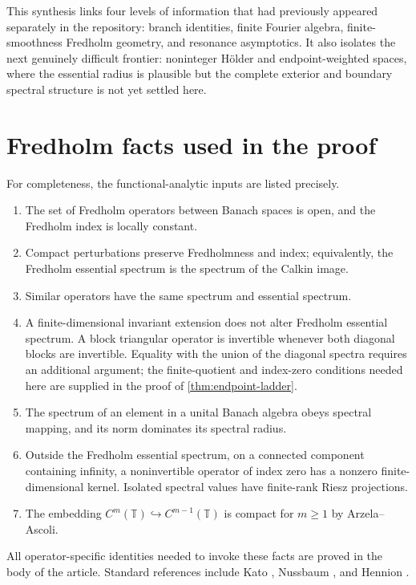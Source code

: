 \documentclass[11pt,a4paper]{article}
\theoremstyle{definition}
\theoremstyle{remark}
\newcommand{\T}{\mathbb T}
\begin{document}
This synthesis links four levels of information that had previously appeared
separately in the repository: branch identities, finite Fourier algebra,
finite-smoothness Fredholm geometry, and resonance asymptotics.  It also
isolates the next genuinely difficult frontier: noninteger H\"older and
endpoint-weighted spaces, where the essential radius is plausible but the
complete exterior and boundary spectral structure is not yet settled here.

\appendix
\section{Fredholm facts used in the proof}
\label{app:fredholm}
For completeness, the functional-analytic inputs are listed precisely.

\begin{enumerate}
\item The set of Fredholm operators between Banach spaces is open, and the
      Fredholm index is locally constant.
\item Compact perturbations preserve Fredholmness and index; equivalently,
      the Fredholm essential spectrum is the spectrum of the Calkin image.
\item Similar operators have the same spectrum and essential spectrum.
\item A finite-dimensional invariant extension does not alter Fredholm
      essential spectrum.  A block triangular operator is invertible whenever
      both diagonal blocks are invertible.  Equality with the union of the
      diagonal spectra requires an additional argument; the finite-quotient
      and index-zero conditions needed here are supplied in the proof of
      \cref{thm:endpoint-ladder}.
\item The spectrum of an element in a unital Banach algebra obeys spectral
      mapping, and its norm dominates its spectral radius.
\item Outside the Fredholm essential spectrum, on a connected component
      containing infinity, a noninvertible operator of index zero has a
      nonzero finite-dimensional kernel.  Isolated spectral values have
      finite-rank Riesz projections.
\item The embedding $C^m(\T)\hookrightarrow C^{m-1}(\T)$ is compact for
      $m\ge1$ by Arzela--Ascoli.
\end{enumerate}
All operator-specific identities needed to invoke these facts are proved in
the body of the article.  Standard references include Kato
\cite{kato}, Nussbaum \cite{nussbaum}, and Hennion \cite{hennion}.
\end{document}

